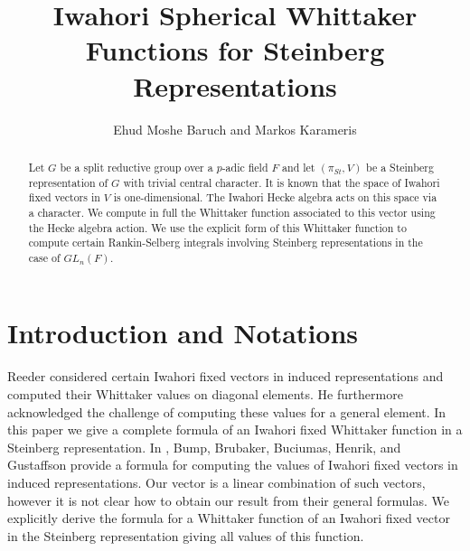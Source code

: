 \documentclass{article}
\begin{document}
\title{Iwahori Spherical Whittaker Functions for Steinberg Representations} \author{Ehud Moshe Baruch and Markos Karameris}\maketitle
\begin{abstract}
    

 Let $G$ be a split reductive group over a $p$-adic field $F$ and let $(\pi_{St},V)$ be a Steinberg representation of $G$ with trivial central character. It is known that the space of Iwahori fixed vectors in $V$ is one-dimensional. The Iwahori Hecke algebra acts on this space via a character. We compute in full the Whittaker function associated to this vector using the Hecke algebra action. We use the explicit form of this Whittaker function to compute certain Rankin-Selberg integrals involving Steinberg representations in the case of $GL_n(F)$.
\end{abstract}

\section{Introduction and Notations}
Reeder \cite{reeder} considered certain Iwahori fixed vectors in induced representations and computed their Whittaker values on diagonal elements. He furthermore acknowledged the challenge of computing these values for a general element. In this paper we give a complete formula of an Iwahori fixed Whittaker function in a Steinberg representation. In \cite{Bump}, Bump, Brubaker, Buciumas, Henrik, and Gustaffson provide a formula for computing the values of Iwahori fixed vectors in induced representations. Our vector is a linear combination of such vectors, however it is not clear how to obtain our result from their general formulas. We explicitly derive the formula for a Whittaker function of an Iwahori fixed vector in the Steinberg representation giving all values of this function.
\end{document}
